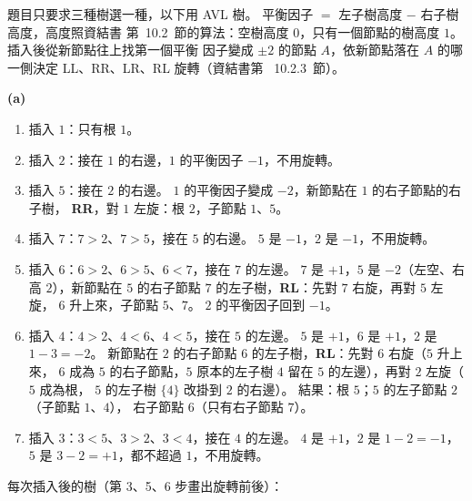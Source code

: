 \begin{pastsoln}
題目只要求三種樹選一種，以下用 AVL 樹。 平衡因子 $=$ 左子樹高度 $-$ 右子樹高度，高度照資結書
第~10.2~節的算法：空樹高度 $0$，只有一個節點的樹高度 $1$。 插入後從新節點往上找第一個平衡
因子變成 $\pm 2$ 的節點 $A$，依新節點落在 $A$ 的哪一側決定 LL、RR、LR、RL 旋轉（資結書第
~10.2.3~節）。

\textbf{(a)}
\begin{enumerate}
\item 插入 $1$：只有根 $1$。
\item 插入 $2$：接在 $1$ 的右邊，$1$ 的平衡因子 $-1$，不用旋轉。
\item 插入 $5$：接在 $2$ 的右邊。 $1$ 的平衡因子變成 $-2$，新節點在 $1$ 的右子節點的右子樹，
\textbf{RR}，對 $1$ 左旋：根 $2$，子節點 $1$、$5$。
\item 插入 $7$：$7 > 2$、$7 > 5$，接在 $5$ 的右邊。 $5$ 是 $-1$，$2$ 是 $-1$，不用旋轉。
\item 插入 $6$：$6 > 2$、$6 > 5$、$6 < 7$，接在 $7$ 的左邊。 $7$ 是 $+1$，$5$ 是 $-2$（左空、右
高 $2$），新節點在 $5$ 的右子節點 $7$ 的左子樹，\textbf{RL}：先對 $7$ 右旋，再對 $5$ 左旋，
$6$ 升上來，子節點 $5$、$7$。 $2$ 的平衡因子回到 $-1$。
\item 插入 $4$：$4 > 2$、$4 < 6$、$4 < 5$，接在 $5$ 的左邊。 $5$ 是 $+1$，$6$ 是 $+1$，$2$ 是
$1 - 3 = -2$。 新節點在 $2$ 的右子節點 $6$ 的左子樹，\textbf{RL}：先對 $6$ 右旋（$5$ 升上來，
$6$ 成為 $5$ 的右子節點，$5$ 原本的左子樹 $4$ 留在 $5$ 的左邊），再對 $2$ 左旋（$5$ 成為根，
$5$ 的左子樹 $\{4\}$ 改掛到 $2$ 的右邊）。 結果：根 $5$；$5$ 的左子節點 $2$（子節點 $1$、$4$），
右子節點 $6$（只有右子節點 $7$）。
\item 插入 $3$：$3 < 5$、$3 > 2$、$3 < 4$，接在 $4$ 的左邊。 $4$ 是 $+1$，$2$ 是 $1 - 2 = -1$，
$5$ 是 $3 - 2 = +1$，都不超過 $1$，不用旋轉。
\end{enumerate}

每次插入後的樹（第 3、5、6 步畫出旋轉前後）：
\begin{center}


\end{center}
\end{pastsoln}
